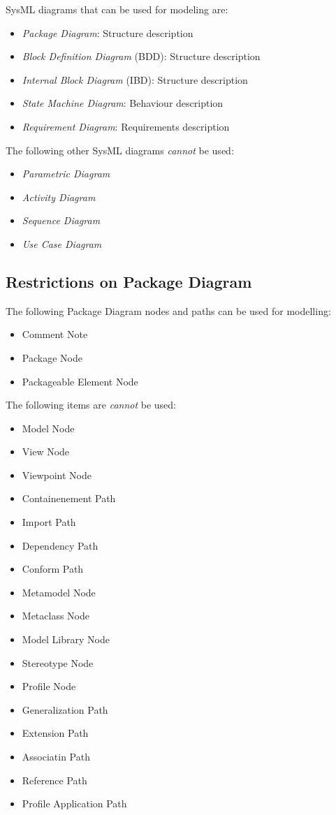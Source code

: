SysML diagrams that can be used for modeling are:
\begin{itemize}
\item \emph{Package Diagram}: Structure description
\item \emph{Block Definition Diagram} (BDD): Structure description
\item \emph{Internal Block Diagram} (IBD): Structure description
\item \emph{State Machine Diagram}: Behaviour description
\item \emph{Requirement Diagram}: Requirements description
\end{itemize}

The following other SysML diagrams \emph{cannot} be used:
\begin{itemize}
\item \emph{Parametric Diagram}
\item \emph{Activity Diagram}
\item \emph{Sequence Diagram}
\item \emph{Use Case Diagram}
\end{itemize}

\subsection{Restrictions on Package Diagram}

The following Package Diagram nodes and paths can be used for
modelling:
\begin{itemize}
\item Comment Note
\item Package Node
\item Packageable Element Node
\end{itemize}

The following items are \emph{cannot} be used:
\begin{itemize}
\item Model Node
\item View Node
\item Viewpoint Node
\item Containenement Path
\item Import Path
\item Dependency Path
\item Conform Path
\item Metamodel Node
\item Metaclass Node
\item Model Library Node
\item Stereotype Node
\item Profile Node
\item Generalization Path
\item Extension Path
\item Associatin Path
\item Reference Path
\item Profile Application Path
\end{itemize}

